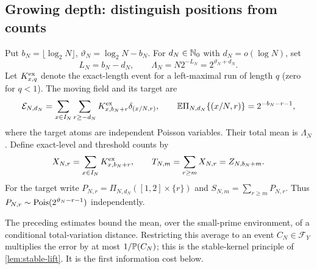 \subsection{Growing depth: distinguish positions from counts}
Put $b_N=\lfloor\log_2N\rfloor$, $\vartheta_N=\log_2N-b_N$. For
$d_N\in\mathbb N_0$ with $d_N=o(\log N)$, set
\[
 L_N=b_N-d_N,\qquad \Lambda_N=N2^{-L_N}=2^{\vartheta_N+d_N}.
\]
Let $K^{\rm ex}_{x,q}$ denote the exact-length event for a left-maximal run
of length $q$ (zero for $q<1$). The moving field and its target are
\begin{equation}\label{eq:moving-field}
 \mathcal E_{N,d_N}=\sum_{x\in I_N}\sum_{r\ge-d_N}
             K^{\rm ex}_{x,b_N+r}\delta_{(x/N,r)},\qquad
 \mathbb E\Pi_{N,d_N}\{(x/N,r)\}=2^{-b_N-r-1},
\end{equation}
where the target atoms are independent Poisson variables. Their total mean
is $\Lambda_N$. Define exact-level and threshold counts by
\[
 X_{N,r}=\sum_{x\in I_N}K^{\rm ex}_{x,b_N+r},\qquad
 T_{N,m}=\sum_{r\ge m}X_{N,r}=Z_{N,b_N+m}.
\]
For the target write $P_{N,r}=\Pi_{N,d_N}([1,2]\times\{r\})$ and
$S_{N,m}=\sum_{r\ge m}P_{N,r}$. Thus
$P_{N,r}\sim\operatorname{Pois}(2^{\vartheta_N-r-1})$ independently.

The preceding estimates bound the mean, over the small-prime environment,
of a conditional total-variation distance. Restricting this average to an
event $C_N\in\mathcal F_Y$ multiplies the error by at most
$1/\mathbb P(C_N)$; this is the stable-kernel principle of
\cref{lem:stable-lift}. It is the first information cost below.

